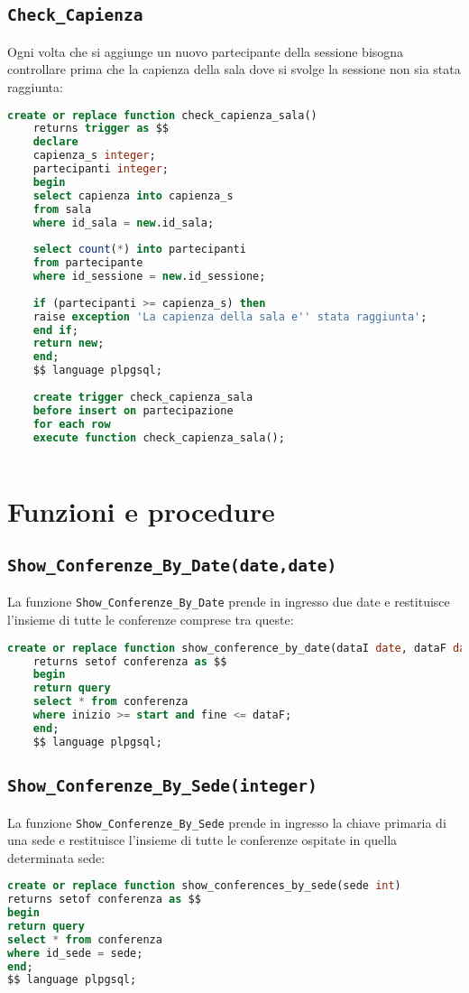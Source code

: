 \subsection{\texttt{Check\_Capienza}}
Ogni volta che si aggiunge un nuovo partecipante della sessione bisogna controllare prima che la capienza della sala dove si svolge la sessione non sia stata raggiunta:
\begin{lstlisting}[language=SQL, style=mystyle]
	create or replace function check_capienza_sala() 
	returns trigger as $$
	declare
	capienza_s integer;
	partecipanti integer;
	begin
	select capienza into capienza_s
	from sala
	where id_sala = new.id_sala;
	
	select count(*) into partecipanti
	from partecipante
	where id_sessione = new.id_sessione;
	
	if (partecipanti >= capienza_s) then
	raise exception 'La capienza della sala e'' stata raggiunta';
	end if;
	return new;
	end;
	$$ language plpgsql;
	
	create trigger check_capienza_sala
	before insert on partecipazione
	for each row
	execute function check_capienza_sala();
	
\end{lstlisting}
\section{Funzioni e procedure}
\subsection{\texttt{Show\_Conferenze\_By\_Date(date,date)}}
La funzione \texttt{Show\_Conferenze\_By\_Date} prende in ingresso due date e restituisce l'insieme di tutte le conferenze comprese tra queste:
\begin{lstlisting}[language=SQL, style=mystyle]
	create or replace function show_conference_by_date(dataI date, dataF date)
	returns setof conferenza as $$
	begin
	return query
	select * from conferenza
	where inizio >= start and fine <= dataF;
	end;
	$$ language plpgsql;
\end{lstlisting}
\subsection{\texttt{Show\_Conferenze\_By\_Sede(integer)}}
La funzione \texttt{Show\_Conferenze\_By\_Sede} prende in ingresso la chiave primaria di una sede e restituisce l'insieme di tutte le conferenze ospitate in quella determinata sede:
\begin{lstlisting}[language=SQL, style=mystyle]
create or replace function show_conferences_by_sede(sede int)
returns setof conferenza as $$
begin
return query
select * from conferenza
where id_sede = sede;
end;
$$ language plpgsql;
\end{lstlisting}
